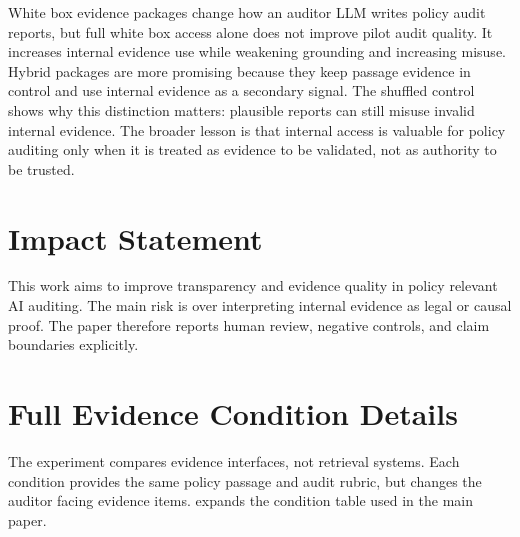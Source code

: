 \documentclass{article}
\begin{document}
White box evidence packages change how an auditor LLM writes policy audit reports, but full white box access alone does not improve pilot audit quality. It increases internal evidence use while weakening grounding and increasing misuse. Hybrid packages are more promising because they keep passage evidence in control and use internal evidence as a secondary signal. The shuffled control shows why this distinction matters: plausible reports can still misuse invalid internal evidence. The broader lesson is that internal access is valuable for policy auditing only when it is treated as evidence to be validated, not as authority to be trusted.

\section*{Impact Statement}

This work aims to improve transparency and evidence quality in policy relevant AI auditing. The main risk is over interpreting internal evidence as legal or causal proof. The paper therefore reports human review, negative controls, and claim boundaries explicitly.

\FloatBarrier




\appendix

\onecolumn

\section{Full Evidence Condition Details}

The experiment compares evidence interfaces, not retrieval systems. Each condition provides the same policy passage and audit rubric, but changes the auditor facing evidence items.  expands the condition table used in the main paper.
\end{document}
